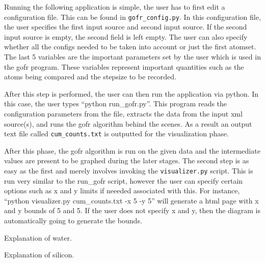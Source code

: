 Running the following application is simple, the user has to first edit a configuration file. This can be found in \verb|gofr_config.py|. In this configuration file, the user specifies the first input source and second input source. If the second input source is empty, the second field is left empty. The user can also specify whether all the configs needed to be taken into account or just the first atomset. The last 5 variables are the important parameters set by the user which is used in the gofr program. These variables represent important quantities such as the atoms being compared and the stepsize to be recorded.




After this step is performed, the user can then run the application via python. In this case, the user types ``python run_gofr.py''. This program reads the configuration parameters from the file, extracts the data from the input xml source(s), and runs the gofr algorithm behind the scenes. As a result an output text file called \verb|cum_counts.txt| is outputted for the visualization phase.





After this phase, the gofr algorithm is run on the given data and the intermediate values are present to be graphed during the later stages. The second step is as easy as the first and merely involves invoking the \verb|visualizer.py| script. This is run very similar to the run_gofr script, however the user can specify certain options such as x and y limits if neeeded associated with this. For instance, ``python visualizer.py cum_counts.txt -x 5 -y 5'' will generate a html page with x and y bounds of 5 and 5. If the user does not specify x and y, then the diagram is automatically going to generate the bounds. 






Explanation of water.

Explanation of silicon.